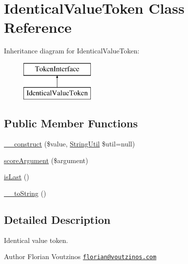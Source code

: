 \hypertarget{class_prophecy_1_1_argument_1_1_token_1_1_identical_value_token}{}\section{Identical\+Value\+Token Class Reference}
\label{class_prophecy_1_1_argument_1_1_token_1_1_identical_value_token}
Inheritance diagram for Identical\+Value\+Token\+:\begin{figure}[H]
\begin{center}
\leavevmode
\includegraphics[height=2.000000cm]{class_prophecy_1_1_argument_1_1_token_1_1_identical_value_token}
\end{center}
\end{figure}
\subsection*{Public Member Functions}
\begin{DoxyCompactItemize}
\item 
\mbox{\hyperlink{class_prophecy_1_1_argument_1_1_token_1_1_identical_value_token_a68b07800b4e9da64f1382e2393b86ec4}{\+\_\+\+\_\+construct}} (\$value, \mbox{\hyperlink{class_prophecy_1_1_util_1_1_string_util}{String\+Util}} \$util=null)
\item 
\mbox{\hyperlink{class_prophecy_1_1_argument_1_1_token_1_1_identical_value_token_a8d5bf47ab6eaa935458d5ad160e52822}{score\+Argument}} (\$argument)
\item 
\mbox{\hyperlink{class_prophecy_1_1_argument_1_1_token_1_1_identical_value_token_ac72b8349b1340887fc1af30eca2b951c}{is\+Last}} ()
\item 
\mbox{\hyperlink{class_prophecy_1_1_argument_1_1_token_1_1_identical_value_token_a7516ca30af0db3cdbf9a7739b48ce91d}{\+\_\+\+\_\+to\+String}} ()
\end{DoxyCompactItemize}


\subsection{Detailed Description}
Identical value token.

\begin{DoxyAuthor}{Author}
Florian Voutzinos \href{mailto:florian@voutzinos.com}{\tt florian@voutzinos.\+com} 
\end{DoxyAuthor}


